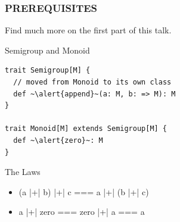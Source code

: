 \documentclass{beamer}
\begin{document}
\begin{frame}[fragile] \frametitle{PREREQUISITES}
Find much more on the first part of this talk.

  \begin{block}{Semigroup and Monoid}
  \begin{lstlisting}
trait Semigroup[M] {
  // moved from Monoid to its own class
  def ~\alert{append}~(a: M, b: => M): M
}

trait Monoid[M] extends Semigroup[M] {
  def ~\alert{zero}~: M
}
  \end{lstlisting}
  \vspace{-0.4cm}
  \end{block}

  \begin{block}{The Laws}
      \begin{itemize}
        \tt
        \item (a |+| b) |+| c === a |+| (b |+| c)
        \item a |+| zero === zero |+| a === a
      \end{itemize}
  \end{block}
\end{frame}
\end{document}
